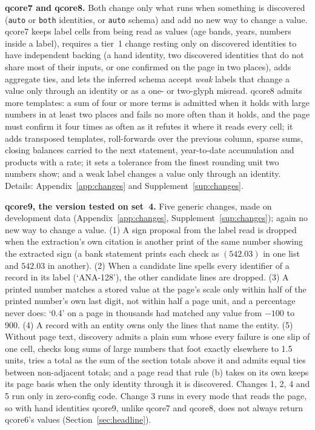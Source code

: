 \documentclass[10pt,twocolumn]{article}
\newcommand{\vq}[1]{\textsf{qcore#1}}
\newcommand{\code}[1]{\texttt{\small #1}}
\begin{document}
\textbf{\vq{7} and \vq{8}.} Both change only what runs when something is discovered (\code{auto} or \code{both} identities, or \code{auto} schema) and add no new way to change a value. \vq{7} keeps label cells from being read as values (age bands, years, numbers inside a label), requires a tier~1 change resting only on discovered identities to have independent backing (a hand identity, two discovered identities that do not share most of their inputs, or one confirmed on the page in two places), adds aggregate ties, and lets the inferred schema accept \emph{weak} labels that change a value only through an identity or as a one- or two-glyph misread. \vq{8} admits more templates: a sum of four or more terms is admitted when it holds with large numbers in at least two places and fails no more often than it holds, and the page must confirm it four times as often as it refutes it where it reads every cell; it adds transposed templates, roll-forwards over the previous column, sparse sums, closing balances carried to the next statement, year-to-date accumulation and products with a rate; it sets a tolerance from the finest rounding unit two numbers show; and a weak label changes a value only through an identity. Details: Appendix~\ref{app:changes} and Supplement~\ref{sup:changes}.

\textbf{\vq{9}, the version tested on set~4.} Five generic changes, made on development data (Appendix~\ref{app:changes}, Supplement~\ref{sup:changes}); again no new way to change a value. (1) A sign proposal from the label read is dropped when the extraction's own citation is another print of the same number showing the extracted sign (a bank statement prints each check as $(542.03)$ in one list and $542.03$ in another). (2) When a candidate line spells every identifier of a record in its label (`ANA-128'), the other candidate lines are dropped. (3) A printed number matches a stored value at the page's scale only within half of the printed number's own last digit, not within half a page unit, and a percentage never does: `0.4' on a page in thousands had matched any value from $-100$ to 900. (4) A record with an entity owns only the lines that name the entity. (5) Without page text, discovery admits a plain sum whose every failure is one slip of one cell, checks long sums of large numbers that foot exactly elsewhere to 1.5 units, tries a total as the sum of the section totals above it and admits equal ties between non-adjacent totals; and a page read that rule (b) takes on its own keeps its page basis when the only identity through it is discovered. Changes 1, 2, 4 and 5 run only in zero-config code. Change 3 runs in every mode that reads the page, so with hand identities \vq{9}, unlike \vq{7} and \vq{8}, does not always return \vq{6}'s values (Section~\ref{sec:headline}).
\end{document}
